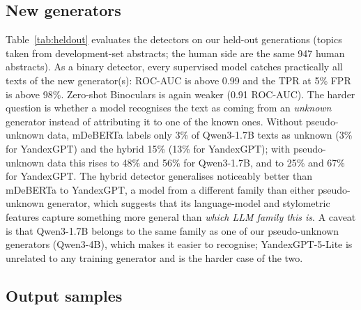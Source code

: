 \documentclass{article}
\begin{document}
\subsection{New generators}
Table~\ref{tab:heldout} evaluates the detectors on our held-out generations (topics taken from development-set abstracts; the human side are the same 947 human abstracts). As a binary detector, every supervised model catches practically all texts of the new generator(s): ROC-AUC is above 0.99 and the TPR at 5\% FPR is above 98\%. Zero-shot Binoculars is again weaker (0.91 ROC-AUC). The harder question is whether a model recognises the text as coming from an \emph{unknown} generator instead of attributing it to one of the known ones. Without pseudo-unknown data, mDeBERTa labels only 3\% of Qwen3-1.7B texts as unknown (3\% for YandexGPT) and the hybrid 15\% (13\% for YandexGPT); with pseudo-unknown data this rises to 48\% and 56\% for Qwen3-1.7B, and to 25\% and 67\% for YandexGPT. The hybrid detector generalises noticeably better than mDeBERTa to YandexGPT, a model from a different family than either pseudo-unknown generator, which suggests that its language-model and stylometric features capture something more general than \emph{which LLM family this is}.
A caveat is that Qwen3-1.7B belongs to the same family as one of our pseudo-unknown generators (Qwen3-4B), which makes it easier to recognise; YandexGPT-5-Lite is unrelated to any training generator and is the harder case of the two.

\begin{table}[tbh!]
\begin{center}
\small

\caption{Held-out generators (never used in training), each paired with the same human abstracts. ROC-AUC and TPR@5\%FPR for human vs.\ AI; Rec$_{unk}$ is the share of generated texts predicted as ``unknown''.}
\label{tab:heldout}
\end{center}
\end{table}

\subsection{Output samples}
\begin{table}[!tbh]
\centering

\caption{Examples from the development set with the gold label and the prediction of the final hybrid detector (TF-IDF + LM + style, pseudo-unknown class). The last two rows are errors: a short GigaChat-Lite abstract attributed to Gemma-2 and a short human abstract attributed to Gemma-2.}
\label{tab:output}
\end{table}
\end{document}
